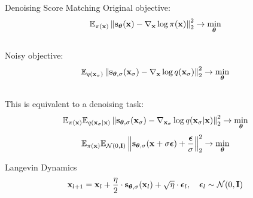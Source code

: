 \documentclass{beamer}
\begin{document}
\begin{frame}{Denoising Score Matching}
	Original objective:
	\vspace{-0.2cm}
	\[
		\mathbb{E}_{\pi(\mathbf{x})}\left\| \mathbf{s}_{\boldsymbol{\theta}}(\mathbf{x}) - \nabla_{\mathbf{x}} \log \pi(\mathbf{x}) \right\|_2^2 \rightarrow \min_{\boldsymbol{\theta}}
	\]
    \eqpause
	\vspace{-0.5cm} \\
	Noisy objective:
	\vspace{-0.2cm}
	\[
		\mathbb{E}_{q(\mathbf{x}_{\sigma})}\left\| \mathbf{s}_{\boldsymbol{\theta}, \sigma}(\mathbf{x}_\sigma) - \nabla_{\mathbf{x}} \log q(\mathbf{x}_{\sigma}) \right\|_2^2 \rightarrow \min_{\boldsymbol{\theta}}
	\]
    \eqpause
	\vspace{-0.5cm} \\
	This is equivalent to a denoising task:
	\vspace{-0.2cm}
	\[
		\mathbb{E}_{\pi(\mathbf{x})} \mathbb{E}_{q(\mathbf{x}_{\sigma} | \mathbf{x})}\left\| \mathbf{s}_{\boldsymbol{\theta}, \sigma}(\mathbf{x}_{\sigma}) - \nabla_{\mathbf{x}_{\sigma}} \log q(\mathbf{x}_{\sigma} | \mathbf{x}) \right\|_2^2 \rightarrow \min_{\boldsymbol{\theta}}
	\]
    \eqpause
	\vspace{-0.3cm}
	\[
		\mathbb{E}_{\pi(\mathbf{x})} \mathbb{E}_{\mathcal{N}(0, \mathbf{I})}\left\| \mathbf{s}_{\boldsymbol{\theta}, \sigma}(\mathbf{x} + \sigma \boldsymbol{\epsilon}) + \frac{\boldsymbol{\epsilon}}{\sigma} \right\|_2^2 \rightarrow \min_{\boldsymbol{\theta}}
	\]
    \eqpause
	\vspace{-0.5cm}
	\begin{block}{Langevin Dynamics}
		\vspace{-0.3cm}
		\[
			\mathbf{x}_{l + 1} = \mathbf{x}_l + \frac{\eta}{2} \cdot \mathbf{s}_{\boldsymbol{\theta}, \sigma}(\mathbf{x}_l) + \sqrt{\eta} \cdot \boldsymbol{\epsilon}_l, \quad \boldsymbol{\epsilon}_l \sim \mathcal{N}(0, \mathbf{I})
		\]
		\vspace{-0.7cm}
	\end{block}
\end{frame}
\end{document}
